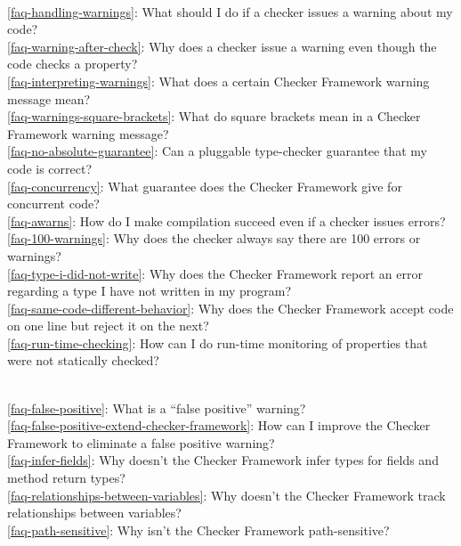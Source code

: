\\ \ref{faq-handling-warnings}: What should I do if a checker issues a warning about my code?
\\ \ref{faq-warning-after-check}: Why does a checker issue a warning even though the code checks a property?
\\ \ref{faq-interpreting-warnings}: What does a certain Checker Framework warning message mean?
\\ \ref{faq-warnings-square-brackets}: What do square brackets mean in a Checker Framework warning message?
\\ \ref{faq-no-absolute-guarantee}: Can a pluggable type-checker guarantee that my code is correct?
\\ \ref{faq-concurrency}: What guarantee does the Checker Framework give for concurrent code?
\\ \ref{faq-awarns}: How do I make compilation succeed even if a checker issues errors?
\\ \ref{faq-100-warnings}: Why does the checker always say there are 100 errors or warnings?
\\ \ref{faq-type-i-did-not-write}: Why does the Checker Framework report an error regarding a type I have not written in my program?
\\ \ref{faq-same-code-different-behavior}: Why does the Checker Framework accept code on one line but reject it on the next?
\\ \ref{faq-run-time-checking}: How can I do run-time monitoring of properties that were not statically checked?

\\ \ref{faq-false-positive}: What is a ``false positive'' warning?
\\ \ref{faq-false-positive-extend-checker-framework}: How can I improve the Checker Framework to eliminate a false positive warning?
\\ \ref{faq-infer-fields}: Why doesn't the Checker Framework infer types for fields and method return types?
\\ \ref{faq-relationships-between-variables}: Why doesn't the Checker Framework track relationships between variables?
\\ \ref{faq-path-sensitive}: Why isn't the Checker Framework path-sensitive?

